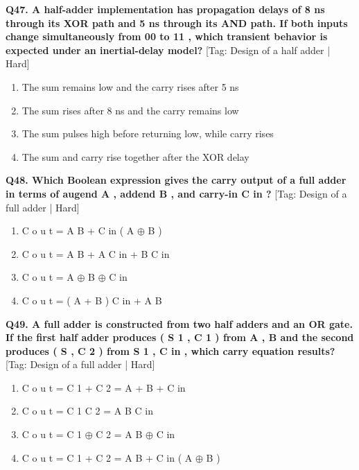 \noindent\textbf{Q47. A half-adder implementation has propagation delays of 8 ns through its XOR path and 5 ns through its AND path. If both inputs change simultaneously from 00 to 11 , which transient behavior is expected under an inertial-delay model?} \hfill [Tag: Design of a half adder | Hard]
\begin{enumerate}[label=(\alph*),topsep=2pt,itemsep=1pt,partopsep=0pt,parsep=0pt]
    \item {The sum remains low and the carry rises after 5 ns}
    \item {The sum rises after 8 ns and the carry remains low}
    \item {The sum pulses high before returning low, while carry rises}
    \item {The sum and carry rise together after the XOR delay}
\end{enumerate}
\vspace{2mm}

\noindent\textbf{Q48. Which Boolean expression gives the carry output of a full adder in terms of augend A , addend B , and carry-in C in ?} \hfill [Tag: Design of a full adder | Hard]
\begin{enumerate}[label=(\alph*),topsep=2pt,itemsep=1pt,partopsep=0pt,parsep=0pt]
    \item {C o u t = A B + C in ( A $\oplus$ B )}
    \item {C o u t = A B + A C in + B C in}
    \item {C o u t = A $\oplus$ B $\oplus$ C in}
    \item {C o u t = ( A + B ) C in + A B}
\end{enumerate}
\vspace{2mm}

\noindent\textbf{Q49. A full adder is constructed from two half adders and an OR gate. If the first half adder produces ( S 1 , C 1 ) from A , B and the second produces ( S , C 2 ) from S 1 , C in , which carry equation results?} \hfill [Tag: Design of a full adder | Hard]
\begin{enumerate}[label=(\alph*),topsep=2pt,itemsep=1pt,partopsep=0pt,parsep=0pt]
    \item {C o u t = C 1 + C 2 = A + B + C in}
    \item {C o u t = C 1 C 2 = A B C in}
    \item {C o u t = C 1 $\oplus$ C 2 = A B $\oplus$ C in}
    \item {C o u t = C 1 + C 2 = A B + C in ( A $\oplus$ B )}
\end{enumerate}
\vspace{2mm}

